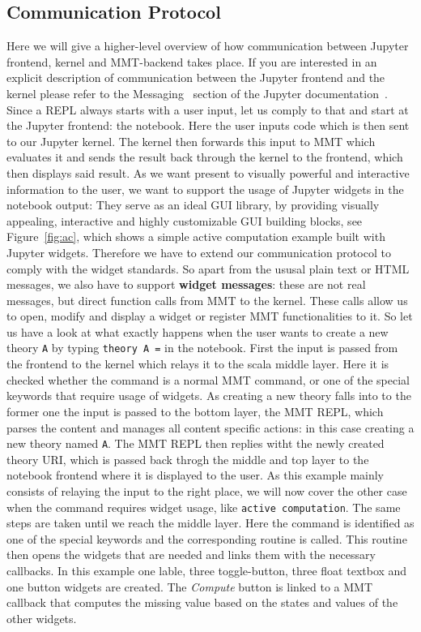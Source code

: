 \subsection{Communication Protocol}
Here we will give a higher-level overview of how communication between Jupyter frontend, kernel and MMT-backend takes place.
If you are interested in an explicit description of communication between the Jupyter frontend and the kernel please refer to the Messaging~\cite{Jupyter messaging} section of the Jupyter documentation~\cite{Jupyter documentation}.
Since a REPL always starts with a user input, let us comply to that and start at the Jupyter frontend: the notebook.
Here the user inputs code which is then sent to our Jupyter kernel.
The kernel then forwards this input to MMT which evaluates it and sends the result back through the kernel to the frontend, which then displays said result.
As we want present to visually powerful and interactive information to the user, we want to support the usage of Jupyter widgets in the notebook output:
They serve as an ideal GUI library, by providing visually appealing, interactive and highly customizable GUI building blocks, see Figure~\ref{fig:ac}, which shows a simple active computation example built with Jupyter widgets.
Therefore we have to extend our communication protocol to comply with the widget standards. So apart from the ususal plain text or HTML messages, we also have to support \textbf{widget messages}: these are not real messages, but direct function calls from MMT to the kernel. These calls allow us to open, modify and display a widget or register MMT functionalities to it.
So let us have a look at what exactly happens when the user wants to create a new theory \texttt{A} by typing \texttt{theory A =} in the notebook.  
First the input is passed from the frontend to the kernel which relays it to the scala middle layer. Here it is checked whether the command is a normal MMT command, or one of the special keywords that require usage of widgets. As creating a new theory falls into to the former one the input is passed to the bottom layer, the MMT REPL, which parses the content and manages all content specific actions: in this case creating a new theory named \texttt{A}. The MMT REPL then replies witht the newly created theory URI, which is passed back throgh the middle and top layer to the notebook frontend where it is displayed to the user.
As this example mainly consists of relaying the input to the right place, we will now cover the other case when the command requires widget usage, like \texttt{active computation}.
The same steps are taken until we reach the middle layer. Here the command is identified as one of the special keywords and the corresponding routine is called. This routine then opens the widgets that are needed and links them with the necessary callbacks. In this example one lable, three toggle-button, three float textbox and one button widgets are created. The \textit{Compute} button is linked to a MMT callback that computes the missing value based on the states and values of the other widgets.


